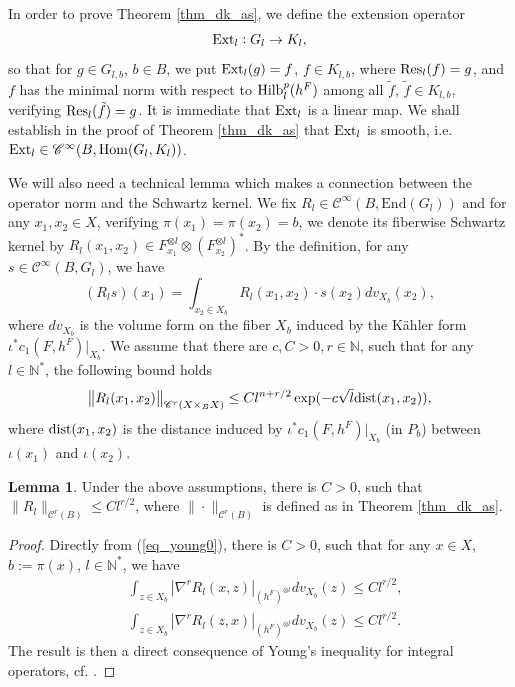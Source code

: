 \documentclass[12pt]{article}
\numberwithin{equation}{section}
\theoremstyle{theorem}
\theoremstyle{definition}
\newtheorem{lem}[thm]{Lemma}
\theoremstyle{remark}
\newcommand{\res}{{\rm{Res}}}
\newcommand{\ext}{{\rm{Ext}}}
\newcommand{\nat}{\mathbb{N}}
\newcommand{\enmr}[1]{\text{End}{(#1)}}
\newcommand{\ccal}{\mathscr{C}}
\begin{document}
	In order to prove Theorem \ref{thm_dk_as}, we define the extension operator
	\begin{equation}\label{eq_ext_op}
		\ext_l :  G_l \to K_l,
	\end{equation}
	so that for $g \in G_{l, b}$, $b \in B$, we put $\ext_l (g) = f$, $f \in K_{l, b}$, where $\res_l(f) = g$, and $f$ has the minimal norm with respect to ${\rm{Hilb}}_l^p(h^F)$ among all $\tilde{f}$, $\tilde{f} \in K_{l, b}$, verifying $\res_l(\tilde{f}) = g$. 
	It is immediate that $\ext_l$ is a linear map.
	We shall establish in the proof of Theorem \ref{thm_dk_as} that $\ext_l$ is smooth, i.e. $\ext_l \in \ccal^{\infty}(B, {\rm{Hom}}(G_l, K_l))$.
	\par 
	We will also need a technical lemma which makes a connection between the operator norm and the Schwartz kernel.
	We fix $R_l \in \ccal^{\infty}(B, \enmr{G_l})$ and for any $x_1, x_2 \in X$, verifying $\pi(x_1) = \pi(x_2) = b$, we denote its fiberwise Schwartz kernel by $R_l(x_1, x_2) \in F_{x_1}^{\otimes l} \otimes (F_{x_2}^{\otimes l})^*$.
	By the definition, for any $s \in \ccal^{\infty}(B, G_l)$, we have 
	\begin{equation}
		(R_l s) (x_1) 
		=
		\int_{x_2 \in X_b}
		R_l(x_1, x_2) \cdot s(x_2) dv_{X_b}(x_2),
	\end{equation}
	where $dv_{X_b}$ is the volume form on the fiber $X_b$ induced by the Kähler form $\iota^* c_1(F, h^F)|_{X_b}$.
	We assume that there are $c, C > 0, r \in \nat$, such that for any $l \in \nat^*$, the following bound holds
	\begin{equation}\label{eq_young0}
		\big\| R_l(x_1, x_2) \big\|_{\ccal^{r}(X \times_B X)} \leq C l^{n + r/2} \exp(- c \sqrt{l} {\rm{dist}}(x_1, x_2)),
	\end{equation}
	where ${\rm{dist}}(x_1, x_2)$ is the distance induced by $\iota^* c_1(F, h^F)|_{X_b}$ (in $P_b$) between $\iota(x_1)$ and $\iota(x_2)$.
	\begin{lem}\label{lem_young}
		Under the above assumptions, there is $C > 0$, such that $\| R_l \|_{\ccal^r(B)} \leq C l^{r / 2}$, where $\| \cdot \|_{\ccal^r(B)}$ is defined as in Theorem \ref{thm_dk_as}.
	\end{lem}
	\begin{proof}
		Directly from (\ref{eq_young0}), there is $C > 0$, such that for any $x \in X$, $b := \pi(x)$, $l \in \nat^*$, we have
		\begin{equation}
		\begin{aligned}
			&
			\int_{z \in X_b}
			|\nabla^r R_l(x, z)|_{(h^F)^{\otimes l}} dv_{X_b}(z)
			\leq
			C l^{r / 2},
			\\
			&
			\int_{z \in X_b}
			|\nabla^r R_l(z, x)|_{(h^F)^{\otimes l}} dv_{X_b}(z)
			\leq
			C l^{r / 2}.
		\end{aligned}
		\end{equation}
		The result is then a direct consequence of Young's inequality for integral operators, cf. \cite[Proposition 2.9 and Corollary 2.10]{FinToeplImm}.
	\end{proof}
\end{document}
